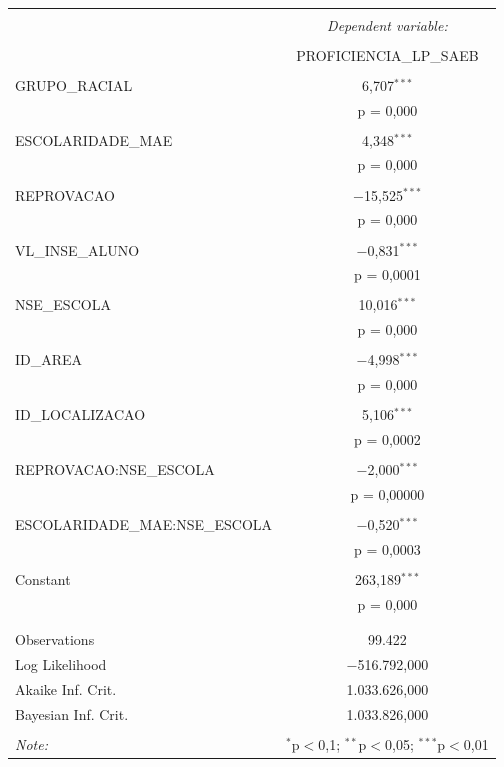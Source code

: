 \begin{table}[!htbp] \centering 
  \caption{} 
  \label{} 
\begin{tabular}{@{\extracolsep{5pt}}lc} 
\\[-1.8ex]\hline 
\hline \\[-1.8ex] 
 & \multicolumn{1}{c}{\textit{Dependent variable:}} \\ 
\cline{2-2} 
\\[-1.8ex] & PROFICIENCIA\_LP\_SAEB \\ 
\hline \\[-1.8ex] 
 GRUPO\_RACIAL & 6,707$^{***}$ \\ 
  & p = 0,000 \\ 
  & \\ 
 ESCOLARIDADE\_MAE & 4,348$^{***}$ \\ 
  & p = 0,000 \\ 
  & \\ 
 REPROVACAO & $-$15,525$^{***}$ \\ 
  & p = 0,000 \\ 
  & \\ 
 VL\_INSE\_ALUNO & $-$0,831$^{***}$ \\ 
  & p = 0,0001 \\ 
  & \\ 
 NSE\_ESCOLA & 10,016$^{***}$ \\ 
  & p = 0,000 \\ 
  & \\ 
 ID\_AREA & $-$4,998$^{***}$ \\ 
  & p = 0,000 \\ 
  & \\ 
 ID\_LOCALIZACAO & 5,106$^{***}$ \\ 
  & p = 0,0002 \\ 
  & \\ 
 REPROVACAO:NSE\_ESCOLA & $-$2,000$^{***}$ \\ 
  & p = 0,00000 \\ 
  & \\ 
 ESCOLARIDADE\_MAE:NSE\_ESCOLA & $-$0,520$^{***}$ \\ 
  & p = 0,0003 \\ 
  & \\ 
 Constant & 263,189$^{***}$ \\ 
  & p = 0,000 \\ 
  & \\ 
\hline \\[-1.8ex] 
Observations & 99.422 \\ 
Log Likelihood & $-$516.792,000 \\ 
Akaike Inf. Crit. & 1.033.626,000 \\ 
Bayesian Inf. Crit. & 1.033.826,000 \\ 
\hline 
\hline \\[-1.8ex] 
\textit{Note:}  & \multicolumn{1}{r}{$^{*}$p$<$0,1; $^{**}$p$<$0,05; $^{***}$p$<$0,01} \\ 
\end{tabular} 
\end{table} 

